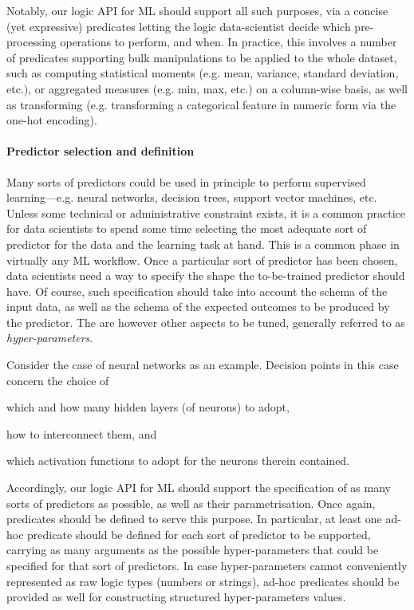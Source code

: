 \documentclass[12pt,a4paper,openright,twoside]{book}
\begin{document}
Notably, our logic API for ML should support all such purposes, via a concise (yet expressive) predicates letting the logic data-scientist decide which pre-processing operations to perform, and when.
%
In practice, this involves a number of predicates supporting bulk manipulations to be applied to the whole dataset, such as computing statistical moments (e.g. mean, variance, standard deviation, etc.), or aggregated measures (e.g. min, max, etc.) on a column-wise basis, as well as transforming (e.g. transforming a categorical feature in numeric form via the one-hot encoding).


\paragraph{Predictor selection and definition}

Many sorts of predictors could be used in principle to perform supervised learning---e.g. neural networks, decision trees, support vector machines, etc.
%
Unless some technical or administrative constraint exists, it is a common practice for data scientists to spend some time selecting the most adequate sort of predictor for the data and the learning task at hand.
%
This is a common phase in virtually any ML workflow.
%
Once a particular sort of predictor has been chosen, data scientists need a way to specify the shape the to-be-trained predictor should have.
%
Of course, such specification should take into account the schema of the input data, as well as the schema of the expected outcomes to be produced by the predictor.
%
The are however other aspects to be tuned, generally referred to as \emph{hyper-parameters}.

Consider the case of neural networks as an example.
%
Decision points in this case concern the choice of
%
\begin{inlinelist}
    \item which and how many hidden layers (of neurons) to adopt,
    \item how to interconnect them, and
    \item which activation functions to adopt for the neurons therein contained.
\end{inlinelist}

Accordingly, our logic API for ML should support the specification of as many sorts of predictors as possible, as well as their parametrisation.
%
Once again, predicates should be defined to serve this purpose.
%
In particular, at least one ad-hoc predicate should be defined for each sort of predictor to be supported, carrying as many arguments as the possible hyper-parameters that could be specified for that sort of predictors.
%
In case hyper-parameters cannot conveniently represented as raw logic types (numbers or strings), ad-hoc predicates should be provided as well for constructing structured hyper-parameters values.
\end{document}
